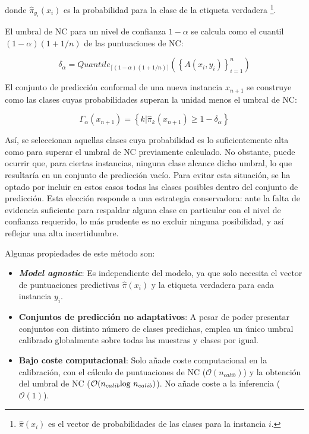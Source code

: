 donde $\hat{\pi}_{y_i}(x_i)$ es la probabilidad para la clase de la etiqueta verdadera%
\footnote{
    $\hat{\pi}(x_i)$ es el vector de probabilidades de las clases para la instancia $i$.
}.


El umbral de \acrshort{NC} para un nivel de confianza $1-\alpha$ se calcula como el cuantil 
$(1-\alpha)(1+1/n)$ de las puntuaciones de \acrshort{NC}:

$$
\delta_\alpha = Quantile_{ \lceil  (1-\alpha) (1 + 1/n)  \rceil } ( \left\{ A(x_i,y_i) \right\}_{i=1}^n)
$$

El conjunto de predicción conformal de una nueva instancia $x_{n+1}$ se construye como las clases cuyas probabilidades superan la unidad menos el umbral de \acrshort{NC}:

$$
\Gamma_\alpha(x_{n+1}) = \left\{ k | \hat{\pi}_k(x_{n+1}) \ge 1-\delta_\alpha \right\} 
$$

Así, se seleccionan aquellas clases cuya probabilidad es lo suficientemente alta como para superar el umbral de \acrshort{NC} previamente calculado. No obstante, puede ocurrir que, para ciertas instancias, ninguna clase alcance dicho umbral, lo que resultaría en un conjunto de predicción vacío. Para evitar esta situación, se ha optado por incluir en estos casos todas las clases posibles dentro del conjunto de predicción. Esta elección responde a una estrategia conservadora: ante la falta de evidencia suficiente para respaldar alguna clase en particular con el nivel de confianza requerido, lo más prudente es no excluir ninguna posibilidad, y así reflejar una alta incertidumbre. 

Algunas propiedades de este método son:

\begin{itemize}

    \item \textbf{\textit{Model agnostic}}: Es independiente del modelo, ya que solo necesita el vector de puntuaciones predictivas $\hat{\pi}(x_i)$ y la etiqueta verdadera para cada instancia $y_i$.  

    \item \textbf{Conjuntos de predicción no adaptativos}: A pesar de poder presentar conjuntos con distinto número de clases predichas, emplea un único umbral calibrado globalmente sobre todas las muestras y clases por igual. 

    \item \textbf{Bajo coste computacional}: Solo añade coste computacional en la calibración, con el cálculo de puntuaciones de \acrshort{NC} ($\mathcal{O}(n_{calib})$) y la obtención del umbral de \acrshort{NC} ($\mathcal{O}(n_{calib} \textnormal{log } n_{calib})$). No añade coste a la inferencia ($\mathcal{O}(1)$).
    
\end{itemize}

